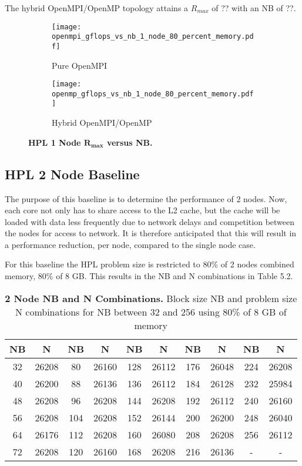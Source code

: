 The hybrid OpenMPI/OpenMP topology attains a $R_{max}$ of ?? with an NB of ??.

\begin{figure}[H]
	\begin{subfigure}{1.0\textwidth}
		\centering
		\texttt{[image: openmpi\_gflops\_vs\_nb\_1\_node\_80\_percent\_memory.pdf]}
		\caption{Pure OpenMPI}
		\label{fig:subim1}
	\end{subfigure}
	\par\bigskip
	\begin{subfigure}{1.0\textwidth}
		\centering
		\texttt{[image: openmp\_gflops\_vs\_nb\_1\_node\_80\_percent\_memory.pdf]}
		\caption{Hybrid OpenMPI/OpenMP}
		\label{fig:subim2}
	\end{subfigure}
\caption{\textbf{HPL 1 Node $\mathbf{R_{max}}$ versus NB.}}
\label{fig:image2}
\end{figure}


%
%
\subsection{HPL 2 Node Baseline}

The purpose of this baseline is to determine the performance of 2 nodes. Now, each core not only has to share access to the L2 cache, but the cache will be loaded with data less frequently due to network delays and competition between the nodes for access to network. It is therefore anticipated that this will result in a performance reduction, per node, compared to the single node case.

For this baseline the HPL problem size is restricted to 80\% of 2 nodes combined memory, 80\% of 8 GB. This results in the NB and N combinations in Table 5.2.

\begin{table}[H]
\begin{center}
	\begin{tabular}{ |c|c|c|c|c|c|c|c|c|c| } 
		\hline
		\textbf{NB} & \textbf{N} & \textbf{NB} & \textbf{N} & \textbf{NB} & \textbf{N} & \textbf{NB} & \textbf{N} & \textbf{NB} & \textbf{N} \\ 
		\hline
		32 & 26208 &  80 & 26160 & 128 & 26112 & 176 & 26048 & 224 & 26208 \\ 
		40 & 26200 &  88 & 26136 & 136 & 26112 & 184 & 26128 & 232 & 25984 \\ 
 		48 & 26208 &  96 & 26208 & 144 & 26208 & 192 & 26112 & 240 & 26160 \\
		56 & 26208 & 104 & 26208 & 152 & 26144 & 200 & 26200 & 248 & 26040 \\ 
 		64 & 26176 & 112 & 26208 & 160 & 26080 & 208 & 26208 & 256 & 26112 \\
		72 & 26208 & 120 & 26160 & 168 & 26208 & 216 & 26136 &   - &     - \\ 
 		\hline
	\end{tabular}
\end{center}
\caption{\label{tab:table-name}\textbf{2 Node NB and N Combinations.}  Block size NB and problem size N combinations for NB between 32 and 256 using 80\% of 8 GB of memory}
\end{table}

